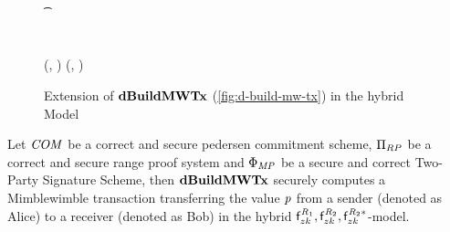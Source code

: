 \begin{figure}
\begin{center}
{\begin{varwidth}{\textwidth}
{            \pcif \color{blue}   \\
            \t \pcreturn \cnstFalsum \\
            \varTx \opFunResult \procFinTx{\funStarAlt{\varPreTx}}{\varSecKeyAlice}{\varNonceAlice} \\
            \< \sendmessageright*{\varTx} \\
            \pcreturn (\varTx, \funStar{\varSpendableCoinAlice}) \< \< \pcreturn (\varTx, \funStar{\varSpendableCoinBob})
            }
        \end{varwidth}
        }
    \end{center}
    \caption{Extension of $\mathbf{dBuildMWTx}$ (\cref{fig:d-build-mw-tx}) in the hybrid Model} \label{fig:atom:hybrid-dbuild}
\end{figure}

\begin{theorem}
    \label{theo:atom:sec-tx}
    Let $\mathit{COM}$ be a correct and secure pedersen commitment scheme, $\Pi_{RP}$ be a correct and secure range proof system and $\Phi_{\mathit{MP}}$ be a secure and correct Two-Party Signature Scheme, then $\mathbf{dBuildMWTx}$ securely computes a Mimblewimble transaction transferring the value $\mathit{p}$ from a sender (denoted as Alice) to a receiver (denoted as Bob) in the hybrid $\mathsf{f}^{\mathit{R}_1}_{zk}, \mathsf{f}^{\mathit{R}_2}_{zk}, \mathsf{f}^{\mathit{R}_2*}_{zk}$-model.
\end{theorem}

